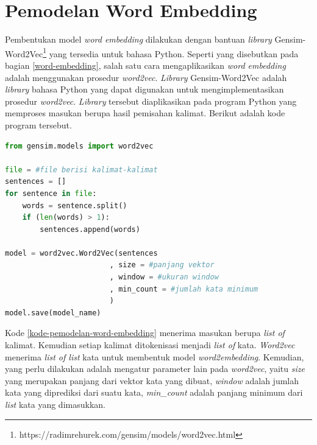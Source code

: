 \section{Pemodelan Word Embedding}
Pembentukan model \textit{word embedding} dilakukan dengan bantuan \textit{library}  Gensim-Word2Vec\footnote{https://radimrehurek.com/gensim/models/word2vec.html} yang tersedia untuk bahasa Python. Seperti yang disebutkan pada bagian \ref{word-embedding}, salah satu cara mengaplikasikan \textit{word embedding} adalah menggunakan prosedur \textit{word2vec}. \textit{Library} Gensim-Word2Vec adalah \textit{library} bahasa Python yang dapat digunakan untuk mengimplementasikan prosedur \textit{word2vec}. \textit{Library} tersebut diaplikasikan pada program Python yang memproses masukan berupa hasil pemisahan kalimat. Berikut adalah kode program tersebut.
\begin{lstlisting}[language=Python, caption={Pemodelan \textit{word embedding}}, label={kode-pemodelan-word-embedding}]
from gensim.models import word2vec

file = #file berisi kalimat-kalimat
sentences = []
for sentence in file:
	words = sentence.split()
	if (len(words) > 1):
		sentences.append(words)

model = word2vec.Word2Vec(sentences 
						, size = #panjang vektor
						, window = #ukuran window
						, min_count = #jumlah kata minimum
						)
model.save(model_name)
\end{lstlisting}
Kode \ref{kode-pemodelan-word-embedding} menerima masukan berupa \textit{list of} kalimat. Kemudian setiap kalimat ditokenisasi menjadi \textit{list of} kata. \textit{Word2vec} menerima \textit{list of list} kata untuk membentuk model \textit{word2embedding}. Kemudian, yang perlu dilakukan adalah mengatur parameter lain pada \textit{word2vec}, yaitu \textit{size} yang merupakan panjang dari vektor kata yang dibuat, \textit{window} adalah jumlah kata yang diprediksi dari suatu kata, \textit{min\_count} adalah panjang minimum dari \textit{list} kata yang dimasukkan.


